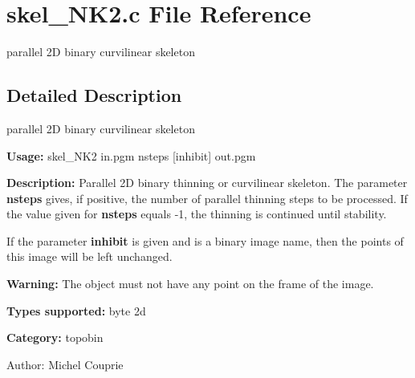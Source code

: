 \section{skel\_\-NK2.c File Reference}
\label{skel__NK2_8c}
parallel 2D binary curvilinear skeleton  




\label{_details}
\subsection{Detailed Description}
parallel 2D binary curvilinear skeleton 

{\bf Usage:} skel\_\-NK2 in.pgm nsteps [inhibit] out.pgm

{\bf Description:} Parallel 2D binary thinning or curvilinear skeleton. The parameter {\bf nsteps} gives, if positive, the number of parallel thinning steps to be processed. If the value given for {\bf nsteps} equals -1, the thinning is continued until stability.

If the parameter {\bf inhibit} is given and is a binary image name, then the points of this image will be left unchanged.

{\bf Warning:} The object must not have any point on the frame of the image.

{\bf Types supported:} byte 2d

{\bf Category:} topobin

\begin{Desc}
\item[Author:]Michel Couprie \end{Desc}

